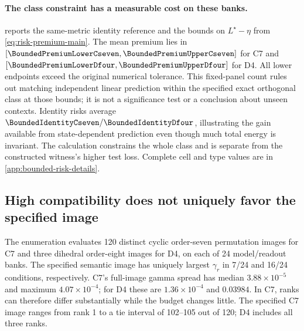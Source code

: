 \begin{table}[t]
\centering\small

\caption{Same-metric reference and class-risk premium on the original Study~2 test bank. Each domain averages \BoundedCellsPerDomain{} fixed cells equally. $p^-=\max\{0,2(1-\gamma_r)-\eta\}$ and $p^+=2(1-\gamma_r^2)-\eta$ are computed per cell before averaging. They bound the mean cost of imposing exact laws and orthogonality jointly. $L(I)$ uses total trivial energy and was also checked by direct residuals on the saved coordinates. These are finite-bank quantities, not transfer losses or confidence limits.}
\label{tab:bounded-risk}
\end{table}

\paragraph{The class constraint has a measurable cost on these banks.}
 reports the same-metric identity reference and the bounds on $L^\star-\eta$ from \cref{eq:risk-premium-main}. The mean premium lies in $[\BoundedPremiumLowerCseven,\BoundedPremiumUpperCseven]$ for C7 and $[\BoundedPremiumLowerDfour,\BoundedPremiumUpperDfour]$ for D4. All \BoundedAllPositive{} lower endpoints exceed the original numerical tolerance. This fixed-panel count rules out matching independent linear prediction within the specified exact orthogonal class at those bounds; it is not a significance test or a conclusion about unseen contexts. Identity risks average $\BoundedIdentityCseven/\BoundedIdentityDfour$, illustrating the gain available from state-dependent prediction even though much total energy is invariant. The calculation constrains the whole class and is separate from the constructed witness's higher test loss. Complete cell and type values are in \cref{app:bounded-risk-details}.

\subsection{High compatibility does not uniquely favor the specified image}
The enumeration evaluates 120 distinct cyclic order-seven permutation images for C7 and three dihedral order-eight images for D4, on each of 24 model/readout banks. The specified semantic image has uniquely largest $\gamma_r$ in 7/24 and 16/24 conditions, respectively. C7's full-image gamma spread has median $3.88\times10^{-5}$ and maximum $4.07\times10^{-4}$; for D4 these are $1.36\times10^{-4}$ and $0.03984$. In C7, ranks can therefore differ substantially while the budget changes little. The specified C7 image ranges from rank 1 to a tie interval of 102--105 out of 120; D4 includes all three ranks.

